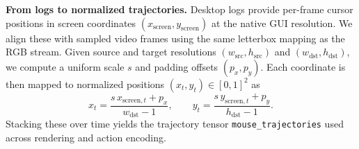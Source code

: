 \noindent\textbf{From logs to normalized trajectories.}
\label{appendix:mouse-traj-normalization}
Desktop logs provide per-frame cursor positions in screen coordinates $(x_\text{screen},y_\text{screen})$ at the native GUI resolution.
We align these with sampled video frames using the same letterbox mapping as the RGB stream.
Given source and target resolutions $(w_\text{src}, h_\text{src})$ and $(w_\text{dst}, h_\text{dst})$, we compute a uniform scale $s$ and padding offsets $(p_x,p_y)$.
Each coordinate is then mapped to normalized positions $(x_t,y_t)\in[0,1]^2$ as
\[
  x_t = \frac{s\,x_{\text{screen},t} + p_x}{w_\text{dst}-1},\qquad
  y_t = \frac{s\,y_{\text{screen},t} + p_y}{h_\text{dst}-1}.
\]
Stacking these over time yields the trajectory tensor \texttt{mouse\_trajectories} used across rendering and action encoding.

